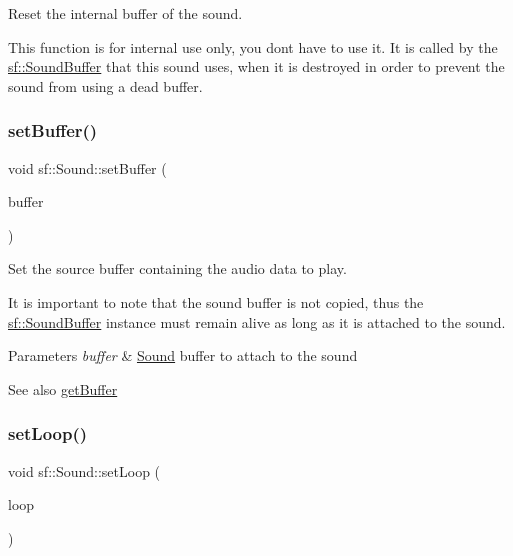Reset the internal buffer of the sound. 

This function is for internal use only, you don\textquotesingle{}t have to use it. It is called by the \hyperlink{classsf_1_1_sound_buffer}{sf\+::\+Sound\+Buffer} that this sound uses, when it is destroyed in order to prevent the sound from using a dead buffer. \mbox{\label{classsf_1_1_sound_a8b395e9713d0efa48a18628c8ec1972e}} 
\subsubsection{\texorpdfstring{set\+Buffer()}{setBuffer()}}
{\footnotesize\ttfamily void sf\+::\+Sound\+::set\+Buffer (\begin{DoxyParamCaption}\item[{const \hyperlink{classsf_1_1_sound_buffer}{Sound\+Buffer} \&}]{buffer }\end{DoxyParamCaption})}



Set the source buffer containing the audio data to play. 

It is important to note that the sound buffer is not copied, thus the \hyperlink{classsf_1_1_sound_buffer}{sf\+::\+Sound\+Buffer} instance must remain alive as long as it is attached to the sound.


\begin{DoxyParams}{Parameters}
{\em buffer} & \hyperlink{classsf_1_1_sound}{Sound} buffer to attach to the sound\\
\hline
\end{DoxyParams}
\begin{DoxySeeAlso}{See also}
\hyperlink{classsf_1_1_sound_ab873727ae652c96b5a9437d7f8d8a44d}{get\+Buffer} 
\end{DoxySeeAlso}
\mbox{\label{classsf_1_1_sound_af23ab4f78f975bbabac031102321612b}} 
\subsubsection{\texorpdfstring{set\+Loop()}{setLoop()}}
{\footnotesize\ttfamily void sf\+::\+Sound\+::set\+Loop (\begin{DoxyParamCaption}\item[{bool}]{loop }\end{DoxyParamCaption})}



